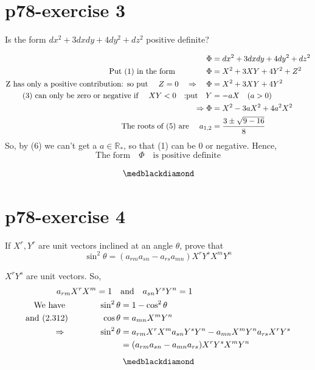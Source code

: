 \section{p78-exercise 3}
\begin{tcolorbox}
Is the form $dx^2+3dxdy+4dy^2+dz^2$ positive definite?
\end{tcolorbox}
\begin{align}
\Phi &= dx^2+3dxdy+4dy^2+dz^2\\
\text{Put (1) in the form}\quad\quad\quad\quad  \Phi &= X^2+3XY+4Y^2+Z^2\\
\text{Z has only a positive contribution: so put }\quad Z=0\quad\Rightarrow \quad \Phi &= X^2+3XY+4Y^2\\
\text{(3) can only be zero or negative if }\quad XY < 0\quad\text{:put}\quad Y & =-aX\quad (a>0)\\
\Rightarrow \Phi &= X^2-3aX^2 +4a^2X^2\\
\text{The roots of (5) are }\quad a_{1,2} &= \frac{3\pm \sqrt{9-16}}{8}
\end{align}
So, by (6) we can't get a $a \in \mathbb{R}_*$, so that (1) can be $0$ or negative. Hence,
$$\text{The form}\quad \Phi \quad \text{is positive definite}$$

$$\medblackdiamond$$
\newpage

\section{p78-exercise 4}
\begin{tcolorbox}
If $X^r, Y^r$ are unit vectors inclined at an angle $\theta$, prove that $$\sin^2 \theta = (a_{rm}a_{sn}- a_{rs}a_{mn})X^r Y^s X^m Y^n$$
\end{tcolorbox}
$X^r Y^s$ are unit vectors. So,
\begin{align}
\ a_{rm}X^rX^m = 1 \quad &\text{and}\quad a_{sn}Y^sY^n = 1\\
\text{We have}\quad\quad\quad\quad \sin^2\theta &= 1 - \cos^2\theta\\
\text{and (2.312)}\quad\quad\quad\quad \cos\theta &= a_{mn}X^mY^n\\
\Rightarrow\quad\quad\quad\quad \sin^2 \theta &= a_{rm}X^rX^m a_{sn}Y^sY^n - a_{mn}X^mY^na_{rs}X^rY^s\\
\ &= (a_{rm} a_{sn} - a_{mn}a_{rs})X^rY^sX^mY^n
\end{align}
$$\medblackdiamond$$
\newpage

